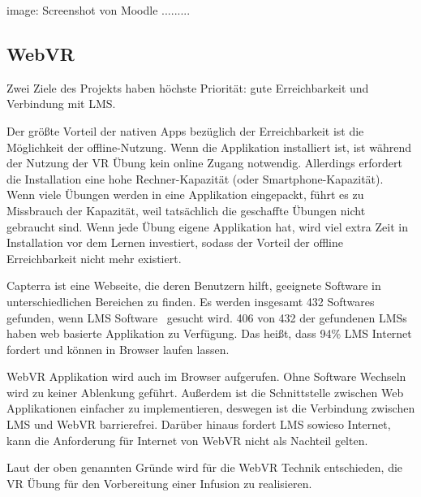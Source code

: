  image: Screenshot von Moodle .........

 \subsection{WebVR}
 Zwei Ziele des Projekts haben höchste Priorität: gute Erreichbarkeit und Verbindung mit LMS.

 Der größte Vorteil der nativen Apps bezüglich der Erreichbarkeit ist die Möglichkeit der offline-Nutzung. Wenn die Applikation installiert ist, ist während der Nutzung der VR Übung kein online Zugang notwendig. Allerdings erfordert die Installation eine hohe Rechner-Kapazität (oder Smartphone-Kapazität). Wenn viele Übungen werden in eine Applikation eingepackt, führt es zu Missbrauch der Kapazität, weil tatsächlich die geschaffte Übungen nicht gebraucht sind. Wenn jede Übung eigene Applikation hat, wird viel extra Zeit in Installation vor dem Lernen investiert, sodass der Vorteil der offline Erreichbarkeit nicht mehr existiert.

 Capterra ist eine Webseite, die deren Benutzern hilft, geeignete Software in unterschiedlichen Bereichen zu finden. Es werden insgesamt 432 Softwares gefunden, wenn \glqq LMS Software \grqq\ gesucht wird. 406 von 432 der gefundenen LMSs haben web basierte Applikation zu Verfügung. Das heißt, dass 94\% LMS Internet fordert und können in Browser laufen lassen.

 WebVR Applikation wird auch im Browser aufgerufen. Ohne Software Wechseln wird zu keiner Ablenkung geführt. Außerdem ist die Schnittstelle zwischen Web Applikationen einfacher zu implementieren, deswegen ist die Verbindung zwischen LMS und WebVR barrierefrei. Darüber hinaus fordert LMS sowieso Internet, kann die Anforderung für Internet von WebVR nicht als Nachteil gelten. 

 Laut der oben genannten Gründe wird für die WebVR Technik entschieden, die VR Übung für den Vorbereitung einer Infusion zu realisieren.

